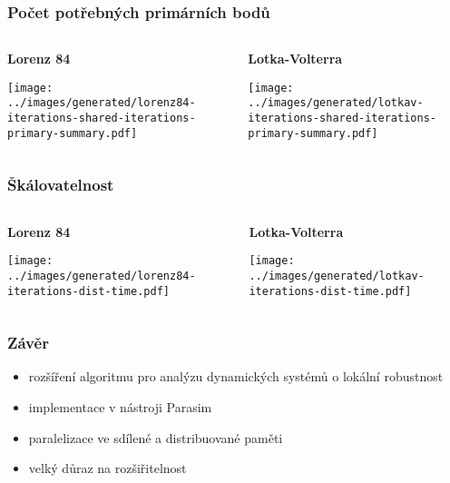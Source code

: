 \documentclass[xcolor=svgnames]{beamer}
\begin{document}
\begin{frame}
	\frametitle{Počet potřebných primárních bodů}

	\begin{columns}[2]
		\begin{column}{0.5\textwidth}
			\begin{center}
				\textbf{Lorenz 84}

				\texttt{[image: ../images/generated/lorenz84-iterations-shared-iterations-primary-summary.pdf]}
			\end{center}
		\end{column}
		\begin{column}{0.5\textwidth}
			\begin{center}
				\textbf{Lotka-Volterra}

				\texttt{[image: ../images/generated/lotkav-iterations-shared-iterations-primary-summary.pdf]}
			\end{center}
		\end{column}
	\end{columns}
\end{frame}
\begin{frame}
	\frametitle{Škálovatelnost}

	\begin{columns}[2]
		\begin{column}{0.5\textwidth}
			\begin{center}
				\textbf{Lorenz 84}

				\texttt{[image: ../images/generated/lorenz84-iterations-dist-time.pdf]}
			\end{center}
		\end{column}
		\begin{column}{0.5\textwidth}
			\begin{center}
				\textbf{Lotka-Volterra}

				\texttt{[image: ../images/generated/lotkav-iterations-dist-time.pdf]}
			\end{center}
		\end{column}
	\end{columns}
\end{frame}
\begin{frame}
	\frametitle{Závěr}
	\begin{itemize}
		\item	rozšíření algoritmu pro analýzu dynamických systémů o lokální robustnost
		\item	implementace v nástroji Parasim
		\item	paralelizace ve sdílené a distribuované paměti
		\item	velký důraz na rozšiřitelnost
	\end{itemize}
\end{frame}
\end{document}
